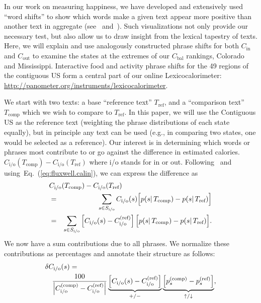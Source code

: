 \documentclass[10pt]{article}
\newcommand{\Req}[1]{Eq.~(\ref{#1})}
\newcommand{\calin}{C_{\textrm{in}}}
\newcommand{\calout}{C_{\textrm{out}}}
\newcommand{\calbal}{C_{\textrm{bal}}}
\newcommand{\calinoutfnsup}[1]{C_{\textrm{i/o}}^{#1}}
\newcommand{\calinoutfn}[1]{C_{\textrm{i/o}}(#1)}
\newcommand{\normfrequency}[2]{p(#1|\,#2)}
\newcommand{\textsymbol}{T}
\newcommand{\phrasesymbol}{s}
\newcommand{\phrasesetsymbol}{S}
\newcommand{\textcomp}{\textsymbol_{\textrm{comp}}}
\newcommand{\textref}{\textsymbol_{\textrm{ref}}}
\newcommand{\foodactivityphrase}{\phrasesymbol}
\newcommand{\foodactivityphraseset}{\phrasesetsymbol_{\textrm{i/o}}}
\begin{document}
In our work on measuring happiness, we have developed and extensively used 
``word shifts'' to show which words make a given text appear more positive
than another text in aggregate (see~\cite{dodds2011e} and~\cite{dodds2015a}).
Such visualizations not only provide our necessary test,
but also allow us to draw insight from the lexical tapestry
of texts.
Here, we will explain and use analogously constructed phrase shifts for both 
$\calin$ and $\calout$ to examine the states at the extremes
of our $\calbal$ rankings, 
Colorado and Mississippi.
Interactive food and activity phrase shifts for the 49 regions of the contiguous US
form a central part of our online Lexicocalorimeter:
\url{http://panometer.org/instruments/lexicocalorimeter}.

We start with two texts:
a base ``reference text'' $\textref$,
and a ``comparison text'' $\textcomp$ which we wish to compare
to $\textref$.
In this paper, we will use the Contiguous US as the reference
text (weighting the 
phrase distributions of each state equally),
but in principle any text can be used (e.g., in comparing two
states, one would be selected as a reference).
Our interest is in determining 
which words or phrases most contribute to or go against
the difference in estimated calories.
$\calinoutfn{\textcomp} - \calinoutfn{\textref}$
where i/o stands for in or out.
Following~\cite{dodds2011e} and using~\Req{eq:fluxwell.calin},
we can express the difference as
\begin{eqnarray}
  \lefteqn{\calinoutfn{\textcomp} - \calinoutfn{\textref}} 
  \nonumber \\ 
  & = &
  \sum_{\foodactivityphrase \in \foodactivityphraseset} 
  \calinoutfn{\foodactivityphrase}
  \Big[
    \normfrequency{\foodactivityphrase}{\textcomp}
    -
    \normfrequency{\foodactivityphrase}{\textref}
  \Big]
  \nonumber \\ 
  & = &
  \sum_{\foodactivityphrase \in \foodactivityphraseset} 
  \left[
    \calinoutfn{\foodactivityphrase} - \calinoutfnsup{(\textrm{ref})}
  \right]
  \Big[
    \normfrequency{\foodactivityphrase}{\textcomp}
    -
    \normfrequency{\foodactivityphrase}{\textref}
  \Big].
  \nonumber \\ 
  \label{eq:fluxwell.delta}
\end{eqnarray}
We now have a sum contributions due 
to all phrases. 
We normalize these contributions
as percentages and annotate their structure as follows:
\begin{eqnarray}
  \lefteqn{\delta \calinoutfn{\foodactivityphrase} =}
  \nonumber \\
  & &
  \frac{100}{
    \left|
      \calinoutfnsup{(\textrm{comp})} - \calinoutfnsup{(\textrm{ref})}
    \right| 
  }
  \underbrace{
    \left[
      \calinoutfn{\foodactivityphrase} - \calinoutfnsup{(\textrm{ref})}
    \right]
  }_{+/-}
  \underbrace{
    \left[
      p_{\foodactivityphrase}^{(\textrm{comp})} - p_{\foodactivityphrase}^{(\textrm{ref})}
    \right]
    }_{\uparrow/\downarrow},
    \nonumber \\ 
  \label{eq:fluxwell.delta-final}
\end{eqnarray}
\end{document}
